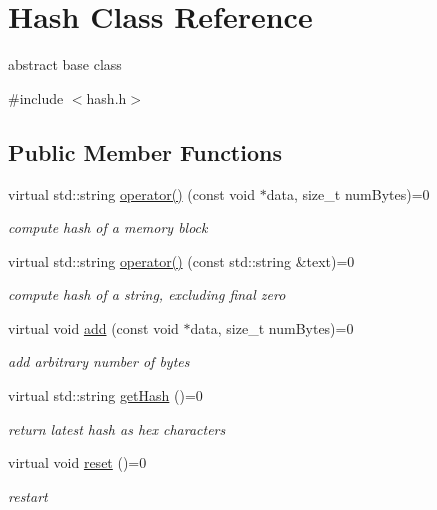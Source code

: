 \hypertarget{class_hash}{}\section{Hash Class Reference}
\label{class_hash}


abstract base class  




{\ttfamily \#include $<$hash.\+h$>$}

\subsection*{Public Member Functions}
\begin{DoxyCompactItemize}
\item 
\mbox{\label{class_hash_a7cf56ee7f4a8fe428dd4bf5fd326c9c9}} 
virtual std\+::string \mbox{\hyperlink{class_hash_a7cf56ee7f4a8fe428dd4bf5fd326c9c9}{operator()}} (const void $\ast$data, size\+\_\+t num\+Bytes)=0
\begin{DoxyCompactList}\small\item\em compute hash of a memory block \end{DoxyCompactList}\item 
\mbox{\label{class_hash_a8174d1f9b20fdd49543bde4401c54c3c}} 
virtual std\+::string \mbox{\hyperlink{class_hash_a8174d1f9b20fdd49543bde4401c54c3c}{operator()}} (const std\+::string \&text)=0
\begin{DoxyCompactList}\small\item\em compute hash of a string, excluding final zero \end{DoxyCompactList}\item 
\mbox{\label{class_hash_a2bf97759f3368581d788c5892b61b960}} 
virtual void \mbox{\hyperlink{class_hash_a2bf97759f3368581d788c5892b61b960}{add}} (const void $\ast$data, size\+\_\+t num\+Bytes)=0
\begin{DoxyCompactList}\small\item\em add arbitrary number of bytes \end{DoxyCompactList}\item 
\mbox{\label{class_hash_ae5acdfb8538e8ba0f8d1310f5feee28f}} 
virtual std\+::string \mbox{\hyperlink{class_hash_ae5acdfb8538e8ba0f8d1310f5feee28f}{get\+Hash}} ()=0
\begin{DoxyCompactList}\small\item\em return latest hash as hex characters \end{DoxyCompactList}\item 
\mbox{\label{class_hash_a08e5a35e060d24b447731fd9893bcc76}} 
virtual void \mbox{\hyperlink{class_hash_a08e5a35e060d24b447731fd9893bcc76}{reset}} ()=0
\begin{DoxyCompactList}\small\item\em restart \end{DoxyCompactList}\end{DoxyCompactItemize}


